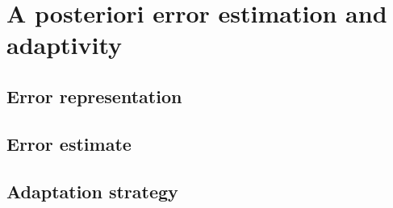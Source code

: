 \section{A posteriori error estimation and adaptivity}
\label{adaptivity}

\subsection{Error representation}
\label{error-representation}

\subsection{Error estimate}
\label{error-estimate}

\subsection{Adaptation strategy}
\label{adaptation-strategy}



